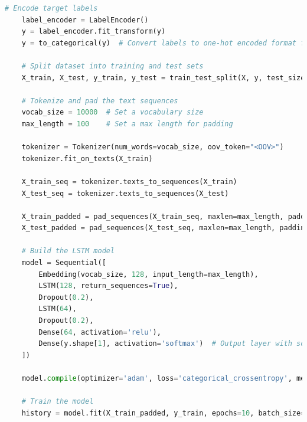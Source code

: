\begin{tcolorbox}[colback=gray!5!white, colframe=gray!80!black, boxrule=0.5pt, title=LSTM Model Implementation]
    \begin{lstlisting}[language=Python]
    # Encode target labels
    label_encoder = LabelEncoder()
    y = label_encoder.fit_transform(y)
    y = to_categorical(y)  # Convert labels to one-hot encoded format for multi-class classification

    # Split dataset into training and test sets
    X_train, X_test, y_train, y_test = train_test_split(X, y, test_size=0.2, random_state=42)

    # Tokenize and pad the text sequences
    vocab_size = 10000  # Set a vocabulary size
    max_length = 100    # Set a max length for padding

    tokenizer = Tokenizer(num_words=vocab_size, oov_token="<OOV>")
    tokenizer.fit_on_texts(X_train)

    X_train_seq = tokenizer.texts_to_sequences(X_train)
    X_test_seq = tokenizer.texts_to_sequences(X_test)

    X_train_padded = pad_sequences(X_train_seq, maxlen=max_length, padding='post', truncating='post')
    X_test_padded = pad_sequences(X_test_seq, maxlen=max_length, padding='post', truncating='post')

    # Build the LSTM model
    model = Sequential([
        Embedding(vocab_size, 128, input_length=max_length),
        LSTM(128, return_sequences=True),
        Dropout(0.2),
        LSTM(64),
        Dropout(0.2),
        Dense(64, activation='relu'),
        Dense(y.shape[1], activation='softmax')  # Output layer with softmax for multi-class classification
    ])

    model.compile(optimizer='adam', loss='categorical_crossentropy', metrics=['accuracy'])

    # Train the model
    history = model.fit(X_train_padded, y_train, epochs=10, batch_size=32, validation_data=(X_test_padded, y_test))

\end{lstlisting}
\end{tcolorbox}

